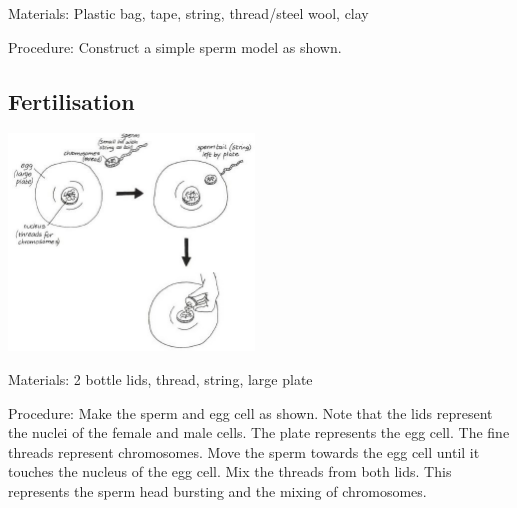 \begin{multicols}{2}
\begin{description*}
\item[Materials:]{Plastic bag, tape, string, thread/steel wool, clay}
\item[Procedure:]{Construct a simple sperm model as shown.}
\end{description*}

\subsection{Fertilisation}

\begin{center}
\includegraphics[width=0.49\textwidth]{./img/vso/fertilisation.jpg}
\end{center}

\begin{description*}
\item[Materials:]{2 bottle lids, thread, string, large plate}
\item[Procedure:]{Make the sperm and egg cell as shown. Note that the lids represent the
nuclei of the female and male cells. The plate represents the egg cell.
The fine threads represent chromosomes. Move the sperm towards the
egg cell until it touches the nucleus of the egg cell. Mix the threads
from both lids. This represents the sperm head bursting and the mixing
of chromosomes.}
\end{description*}


\end{multicols}
